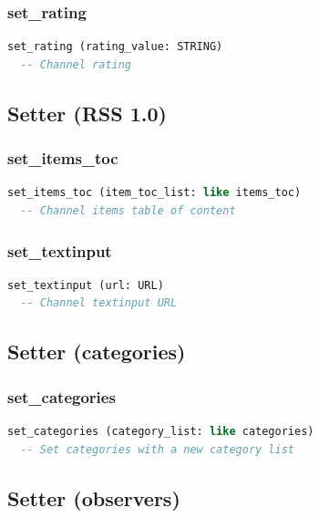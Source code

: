 \subsubsection{set\_rating}

\begin{lstlisting}[language=Eiffel]
set_rating (rating_value: STRING)
  -- Channel rating
\end{lstlisting}

\subsection{Setter (RSS 1.0)}
\label{sec:channel-setter-rss10}

\subsubsection{set\_items\_toc}

\begin{lstlisting}[language=Eiffel]
set_items_toc (item_toc_list: like items_toc)
  -- Channel items table of content 
\end{lstlisting}

\subsubsection{set\_textinput}

\begin{lstlisting}[language=Eiffel]
set_textinput (url: URL)
  -- Channel textinput URL
\end{lstlisting}

\subsection{Setter (categories)}
\label{sec:channel-setter-categories}

\subsubsection{set\_categories}

\begin{lstlisting}[language=Eiffel]
set_categories (category_list: like categories)
  -- Set categories with a new category list
\end{lstlisting}

\subsection{Setter (observers)}
\label{sec:channel-setter-observer}

